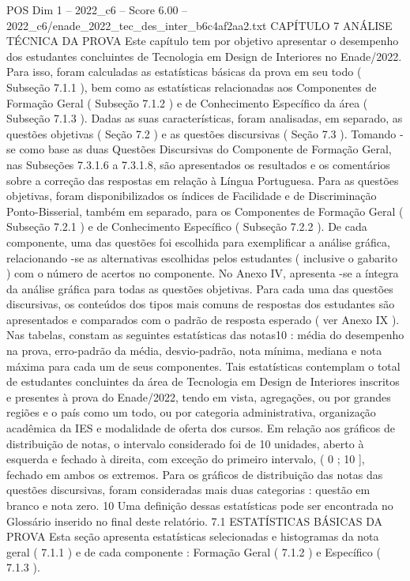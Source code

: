 \begin{textsample}{POS Dim 1 – 2022\_c6 – Score 6.00 – 2022\_c6/enade\_2022\_tec\_des\_inter\_b6c4af2aa2.txt}  \label{ex:f1_pos_261}
CAPÍTULO 7 ANÁLISE TÉCNICA DA PROVA Este capítulo tem por objetivo apresentar o desempenho dos estudantes concluintes de Tecnologia em Design de Interiores no Enade/2022.
Para isso, foram calculadas as estatísticas básicas da prova em seu todo ( Subseção 7.1.1 ), bem como as estatísticas relacionadas aos Componentes de Formação Geral ( Subseção 7.1.2 ) e de Conhecimento Específico da área ( Subseção 7.1.3 ).
Dadas as suas características, foram analisadas, em separado, as questões objetivas ( Seção 7.2 ) e as questões discursivas ( Seção 7.3 ).
Tomando -se como base as duas Questões Discursivas do Componente de Formação Geral, nas Subseções 7.3.1.6 a 7.3.1.8, são apresentados os resultados e os comentários sobre a correção das respostas em relação à Língua Portuguesa.
Para as questões objetivas, foram disponibilizados os índices de Facilidade e de Discriminação Ponto-Bisserial, também em separado, para os Componentes de Formação Geral ( Subseção 7.2.1 ) e de Conhecimento Específico ( Subseção 7.2.2 ).
De cada componente, uma das questões foi escolhida para exemplificar a análise gráfica, relacionando -se as alternativas escolhidas pelos estudantes ( inclusive o gabarito ) com o número de acertos no componente.
No Anexo IV, apresenta -se a íntegra da análise gráfica para todas as questões objetivas.
Para cada uma das questões discursivas, os conteúdos dos tipos mais comuns de respostas dos estudantes são apresentados e comparados com o padrão de resposta esperado ( ver Anexo IX ).
Nas tabelas, constam as seguintes estatísticas das notas10 : média do desempenho na prova, erro-padrão da média, desvio-padrão, nota mínima, mediana e nota máxima para cada um de seus componentes.
Tais estatísticas contemplam o total de estudantes concluintes da área de Tecnologia em Design de Interiores inscritos e presentes à prova do Enade/2022, tendo em vista, agregações, ou por grandes regiões e o país como um todo, ou por categoria administrativa, organização acadêmica da IES e modalidade de oferta dos cursos.
Em relação aos gráficos de distribuição de notas, o intervalo considerado foi de 10 unidades, aberto à esquerda e fechado à direita, com exceção do primeiro intervalo, ( 0 ; 10 ], fechado em ambos os extremos.
Para os gráficos de distribuição das notas das questões discursivas, foram consideradas mais duas categorias : questão em branco e nota zero. 10 Uma definição dessas estatísticas pode ser encontrada no Glossário inserido no final deste relatório. 7.1 ESTATÍSTICAS BÁSICAS DA PROVA Esta seção apresenta estatísticas selecionadas e histogramas da nota geral ( 7.1.1 ) e de cada componente : Formação Geral ( 7.1.2 ) e Específico ( 7.1.3 ).

\end{textsample}
